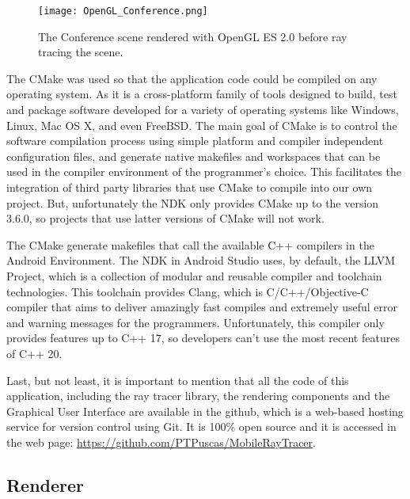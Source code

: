 \begin{figure}[H]
	\centering
	\caption{The Conference scene rendered with OpenGL ES 2.0 before ray tracing the scene.}
	\label{The Conference scene rendered with OpenGL ES 2.0 before ray tracing the scene.}
	\texttt{[image: OpenGL\_Conference.png]}
\end{figure}

\par
The CMake was used so that the application code could be compiled on any operating system.
As it is a cross-platform family of tools designed to build, test and package software developed for a variety of operating systems like Windows, Linux, Mac OS X, and even FreeBSD.
The main goal of CMake is to control the software compilation process using simple platform and compiler independent configuration files, and generate native makefiles and workspaces that can be used in the compiler environment of the programmer's choice.
This facilitates the integration of third party libraries that use CMake to compile into our own project.
But, unfortunately the NDK only provides CMake up to the version 3.6.0, so projects that use latter versions of CMake will not work.

\par
The CMake generate makefiles that call the available C++ compilers in the Android Environment.
The NDK in Android Studio uses, by default, the LLVM Project, which is a collection of modular and reusable compiler and toolchain technologies.
This toolchain provides Clang, which is C/C++/Objective-C compiler that aims to deliver amazingly fast compiles and extremely useful error and warning messages for the programmers.
Unfortunately, this compiler only provides features up to C++ 17, so developers can't use the most recent features of C++ 20.

\par
Last, but not least, it is important to mention that all the code of this application, including the ray tracer library, the rendering components and the Graphical User Interface are available in the github, which is a web-based hosting service for version control using Git.
It is 100\% open source and it is accessed in the web page:
\url{https://github.com/PTPuscas/MobileRayTracer}.

\subsection{Renderer}

